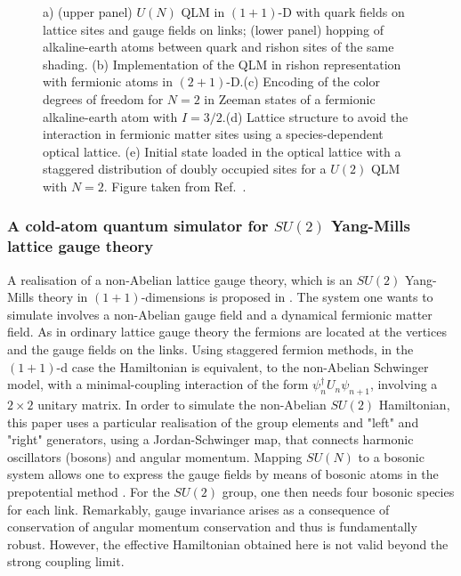 \documentclass[epj,final]{svjour}
\begin{document}
\begin{figure}
\caption{ a) (upper panel) $U(N)$ QLM in $(1+1)$-D with quark fields on lattice sites and gauge fields on links; (lower panel) hopping of alkaline-earth atoms between quark and rishon sites of the same shading. (b) Implementation of the QLM in rishon representation with fermionic atoms in $(2+1)$-D.(c) Encoding of the color degrees of freedom for $N=2$ in Zeeman states of a fermionic alkaline-earth atom with $I=3/2$.(d) Lattice structure to avoid the interaction in fermionic matter sites using a species-dependent optical lattice. (e) Initial state loaded in the optical lattice with a staggered distribution of doubly occupied sites for a $U(2)$ QLM with $N=2$. Figure taken from Ref.~\cite{banerjee2013atomic}.}
\end{figure} 

\subsubsection{A cold-atom quantum simulator for $SU(2)$ Yang-Mills lattice gauge theory\cite{zohar2013cold}}

A realisation of a non-Abelian lattice gauge theory, which is an $SU(2)$ Yang-Mills theory in $(1+1)$-dimensions is proposed in \cite{zohar2013cold}. The system one wants to simulate involves a non-Abelian gauge field and a dynamical fermionic matter field. As in ordinary lattice gauge theory the fermions are located at the vertices and the gauge fields on the links. Using staggered fermion methods, in the $(1+1)$-d case the Hamiltonian is equivalent, to the non-Abelian Schwinger model, with a minimal-coupling interaction of the form $\psi_n^\dagger U_n \psi_{n+1}$, involving a   $2\times 2$ unitary matrix. In order to simulate the non-Abelian $SU(2)$ Hamiltonian, this paper uses a particular realisation of the group elements and "left" and "right" generators, using a Jordan-Schwinger map, that connects harmonic oscillators (bosons) and angular momentum. Mapping $SU(N)$ to a bosonic system allows one to express the gauge fields by means of bosonic atoms in the prepotential method \cite{mathur2005harmonic}. For the $SU(2)$ group, one then needs four bosonic species for each link. Remarkably, gauge invariance arises as a consequence of conservation of angular momentum conservation and thus is fundamentally robust. However, the effective Hamiltonian obtained here is not valid beyond the strong coupling limit. 
\end{document}
